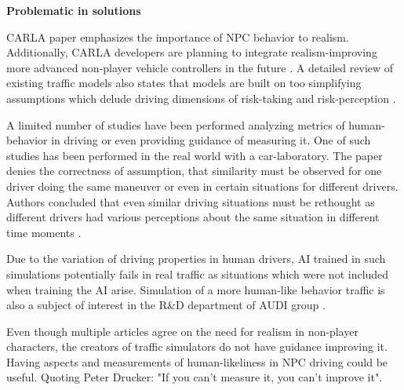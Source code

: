 \documentclass{VUMIFPS-master-intro}
\begin{document}
\textbf{Problematic in solutions}

CARLA paper emphasizes the importance of NPC behavior to realism. Additionally, 
CARLA developers are planning to integrate realism-improving more advanced 
non-player vehicle controllers in the future \cite{Dosovitskiy2017}. A detailed 
review of existing traffic models also states that models are built on too 
simplifying assumptions which delude driving dimensions of risk-taking and 
risk-perception \cite{Eskandarian2017}. 

A limited number of studies have been performed analyzing metrics of human-behavior in driving or even providing guidance of measuring it. One of such studies has been performed in the real world with a car-laboratory. The paper denies the correctness of assumption, that similarity must be observed for one driver doing the same maneuver or even in certain situations for different drivers. Authors concluded that even similar driving situations must be rethought as different drivers had various perceptions about the same situation in different time moments \cite{Blaszczyk2015}.

Due to the variation of driving properties in human drivers, AI trained in such simulations potentially fails in real traffic as situations which were not included when training the AI arise. Simulation of a more human-like behavior traffic is also a subject of interest in the R\&D department of AUDI group \cite{AUDI2018}.

Even though multiple articles agree on the need for realism in non-player characters, the creators of traffic simulators do not have guidance improving it. Having aspects and measurements of human-likeliness in NPC driving could be useful.
Quoting Peter Drucker: "If you can't measure it, you can't improve it".


\end{document}
